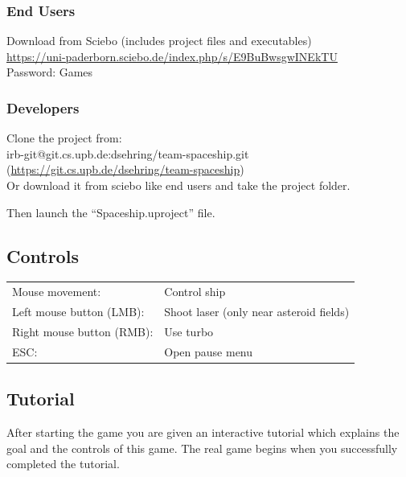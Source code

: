 \documentclass[11pt,a4paper]{article}
\begin{document}
        	\subsubsection{End Users}
            	
                Download from Sciebo (includes project files and executables)\\
                \href{https://uni-paderborn.sciebo.de/index.php/s/E9BuBwsgwINEkTU}{https://uni-paderborn.sciebo.de/index.php/s/E9BuBwsgwINEkTU} \\
                Password: Games
        
        	\subsubsection{Developers}
            
                Clone the project from: \\
                irb-git@git.cs.upb.de:dsehring/team-spaceship.git (\href{https://git.cs.upb.de/dsehring/team-spaceship}{https://git.cs.upb.de/dsehring/team-spaceship})\\
                Or download it from sciebo like end users and take the project folder.
                
                Then launch the \enquote{Spaceship.uproject} file.
        
        \subsection{Controls}
        	
            \begin{tabular}{ll}
            	Mouse movement: & Control ship \\
                Left mouse button (LMB): & Shoot laser (only near asteroid fields) \\
                Right mouse button (RMB): & Use turbo \\
                ESC: & Open pause menu \\
            \end{tabular}
            
        \subsection{Tutorial}
        
        	After starting the game you are given an interactive tutorial which explains the goal and the controls of this game.
The real game begins when you successfully completed the tutorial.
    
\end{document}

